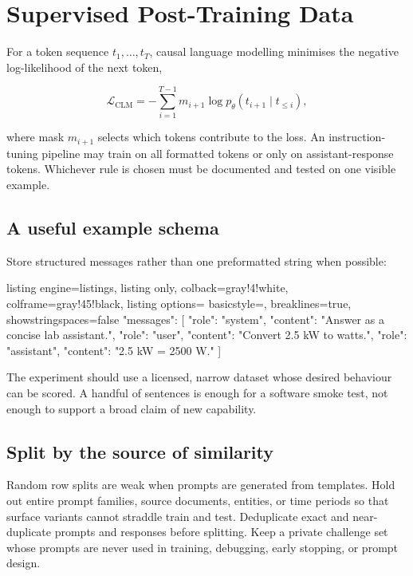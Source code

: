 \section{Supervised Post-Training Data}

For a token sequence $t_1,\ldots,t_T$, causal language modelling minimises the
negative log-likelihood of the next token,

\begin{equation}
    \mathcal{L}_{\mathrm{CLM}}
    = -\sum_{i=1}^{T-1}
      m_{i+1}\log p_{\theta}(t_{i+1}\mid t_{\leq i}),
    \label{eq:causal-lm-loss}
\end{equation}

where mask $m_{i+1}$ selects which tokens contribute to the loss.
An instruction-tuning pipeline may train on all formatted tokens or only on
assistant-response tokens.
Whichever rule is chosen must be documented and tested on one visible example.

\subsection{A useful example schema}

Store structured messages rather than one preformatted string when possible:

\begin{tcblisting}{
    listing engine=listings,
    listing only,
    colback=gray!4!white,
    colframe=gray!45!black,
    listing options={
        basicstyle=\ttfamily\footnotesize,
        breaklines=true,
        showstringspaces=false}}
{"messages": [
  {"role": "system", "content": "Answer as a concise lab assistant."},
  {"role": "user", "content": "Convert 2.5 kW to watts."},
  {"role": "assistant", "content": "2.5 kW = 2500 W."}
]}
\end{tcblisting}

The experiment should use a licensed, narrow dataset whose desired behaviour
can be scored.
A handful of sentences is enough for a software smoke test, not enough to
support a broad claim of new capability.

\subsection{Split by the source of similarity}

Random row splits are weak when prompts are generated from templates.
Hold out entire prompt families, source documents, entities, or time periods so
that surface variants cannot straddle train and test.
Deduplicate exact and near-duplicate prompts and responses before splitting.
Keep a private challenge set whose prompts are never used in training,
debugging, early stopping, or prompt design.

